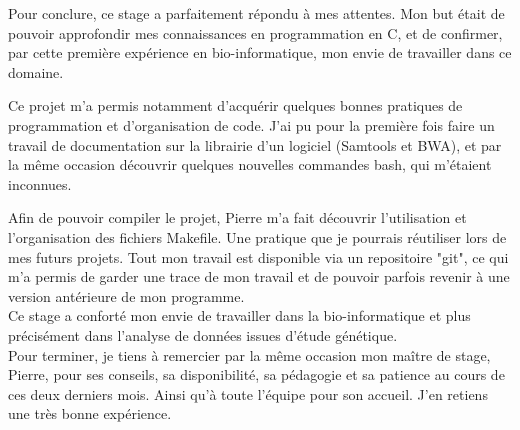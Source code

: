\documentclass[a4paper,12pt]{article}
\begin{document}
Pour conclure, ce stage a parfaitement répondu à mes attentes. Mon but était de pouvoir approfondir mes connaissances en programmation en C, et de confirmer, par cette première expérience en bio-informatique, mon envie de travailler dans ce domaine. 

Ce projet m'a permis notamment d'acquérir quelques bonnes pratiques de programmation et d'organisation de code. J'ai pu pour la première fois faire un travail de documentation sur la librairie d'un logiciel (Samtools et BWA), et par la même occasion découvrir quelques nouvelles commandes bash, qui m'étaient inconnues.  

Afin de pouvoir compiler le projet, Pierre m'a fait découvrir l'utilisation et l'organisation des fichiers Makefile. Une pratique que je pourrais réutiliser lors de mes futurs projets. Tout mon travail est disponible via un repositoire "git", ce qui m'a permis de garder une trace de mon travail et de pouvoir parfois revenir à une version antérieure de mon programme. \\
 
Ce stage a conforté mon envie de travailler dans la bio-informatique et plus précisément dans l'analyse de données issues d'étude génétique. \\
 
Pour terminer, je tiens à remercier par la même occasion mon maître de stage, Pierre, pour ses conseils, sa disponibilité, sa pédagogie et sa patience au cours de ces deux derniers mois. Ainsi qu'à toute l'équipe pour son accueil. J'en retiens une très bonne expérience.

\clearpage


\end{document}
